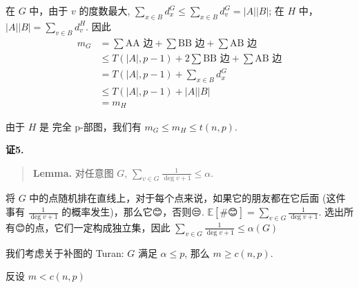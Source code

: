 
在 $G$ 中，由于 $v$ 的度数最大, $\sum_{x\in B}d_x^G\leq \sum_{x\in B}d_v^G=|A||B|$; 在 $H$ 中，$|A||B|=\sum_{v\in B}d_v^H$. 因此
\begin{align}
m_G&=\sum\text{AA 边}+\sum\text{BB 边}+\sum\text{AB 边}\nonumber\\&\leq T(|A|,p-1)+2\sum\text{BB 边}+\sum\text{AB 边}\nonumber\\&=T(|A|,p-1)+\sum_{x\in B}d_x^G\nonumber\\&\leq T(|A|,p-1)+|A||B|\nonumber\\&= m_H\nonumber
\end{align}

由于 $H$ 是 完全 p-部图，我们有 $m_G\leq m_H\leq t(n,p)$.

\textbf{证5.}

\begin{quotation}
\textbf{Lemma.} 对任意图 $G$, $\sum_{v\in G}\frac{1}{\deg v+1}\leq\alpha$.
\end{quotation}

将 $G$ 中的点随机排在直线上，对于每个点来说，如果它的朋友都在它后面 (这件事有 $\frac{1}{\deg v+1}$ 的概率发生)，那么它😊，否则😒. $\mathbb{E}[\#😊]=\sum_{v\in G}\frac{1}{\deg v+1}$. 选出所有😊的点，它们一定构成独立集，因此 $\sum_{v\in G}\frac{1}{\deg v+1}\leq\alpha(G)$

我们考虑关于补图的 Turan: $G$ 满足 $\alpha\leq p$, 那么 $m\geq c(n,p)$.

反设 $m< c(n,p)$
